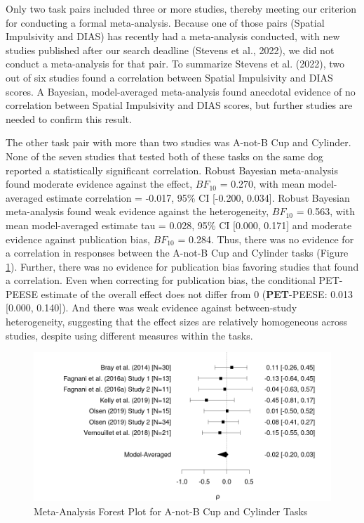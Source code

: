 \documentclass[
  ,pub,floatsintext]{apa6}
\begin{document}
Only two task pairs included three or more studies, thereby meeting our criterion for conducting a formal meta-analysis. Because one of those pairs (Spatial Impulsivity and DIAS) has recently had a meta-analysis conducted, with new studies published after our search deadline (Stevens et al., 2022), we did not conduct a meta-analysis for that pair. To summarize Stevens et al. (2022), two out of six studies found a correlation between Spatial Impulsivity and DIAS scores. A Bayesian, model-averaged meta-analysis found anecdotal evidence of no correlation between Spatial Impulsivity and DIAS scores, but further studies are needed to confirm this result.

The other task pair with more than two studies was A-not-B Cup and Cylinder. None of the seven studies that tested both of these tasks on the same dog reported a statistically significant correlation. Robust Bayesian meta-analysis found moderate evidence against the effect, \(BF_{10}\) = 0.270, with mean model-averaged estimate correlation = -0.017, 95\% CI {[}-0.200, 0.034{]}. Robust Bayesian meta-analysis found weak evidence against the heterogeneity, \(BF_{10}\) = 0.563, with mean model-averaged estimate tau = 0.028, 95\% CI {[}0.000, 0.171{]} and moderate evidence against publication bias, \(BF_{10}\) = 0.284. Thus, there was no evidence for a correlation in responses between the A-not-B Cup and Cylinder tasks (Figure \ref{fig:forest}). Further, there was no evidence for publication bias favoring studies that found a correlation. Even when correcting for publication bias, the conditional PET-PEESE estimate of the overall effect does not differ from 0 (\textbf{PET}-PEESE: 0.013 {[}0.000, 0.140{]}). And there was weak evidence against between-study heterogeneity, suggesting that the effect sizes are relatively homogeneous across studies, despite using different measures within the tasks.

\begin{figure}
\caption{\newline Meta-Analysis Forest Plot for A-not-B Cup and Cylinder Tasks \label{fig:forest}}
\begin{center}
\includegraphics[width=0.8\linewidth]{"figures/anotb-cylinder-forestplot.png"}
\end{center}


\end{figure}
\end{document}
